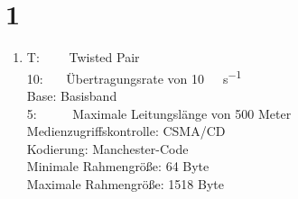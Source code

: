 \documentclass[ngerman]{scrartcl}
\begin{document}
\section*{1}
	\begin{enumerate}[label=\alph*)]
		\item
		T: \ \ \ \ Twisted Pair \\
		10: \ \ \ Übertragungsrate von \SI{10}{\mega\bit\per\s} \\
		Base: Basisband \\
		5: \ \ \ \ \ Maximale Leitungslänge von 500 Meter \\
		\newline
		Medienzugriffskontrolle: CSMA/CD \\
		Kodierung: Manchester-Code \\
		Minimale Rahmengröße: 64 Byte \\
		Maximale Rahmengröße: 1518 Byte \\


\end{enumerate}
\end{document}

